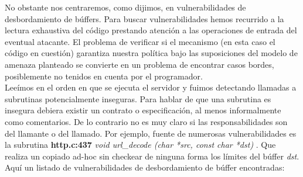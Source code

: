 \documentclass[12pt]{article}
\begin{document}
No obstante nos centraremos, como dijimos, en vulnerabilidades de desbordamiento de búffers. Para buscar vulnerabilidades hemos recurrido a la lectura exhaustiva del código prestando atención a las operaciones de entrada del eventual atacante. El problema de verificar si el mecanismo (en esta caso el código en cuestión) garantiza nuestra política bajo las suposiciones del modelo de amenaza planteado se convierte en un problema de encontrar casos bordes, posiblemente no tenidos en cuenta por el programador. \\

Leeímos en el orden en que se ejecuta el servidor y fuimos detectando llamadas a subrutinas potencialmente inseguras. Para hablar de que una subrutina es insegura debiera existir un contrato o especificación, al menos informalmente como comentarios. De lo contrario no es muy claro si las responsabilidades son del llamante o del llamado. Por ejemplo, fuente de numerosas vulnerabilidades es la subrutina \textbf{ \lbrack http.c:437\rbrack } \textit{ void url\_decode (char *src, const char *dst) }. Que realiza un copiado ad-hoc sin checkear de ninguna forma los límites del búffer \textit{dst}. \\

Aquí un listado de vulnerabilidades de desbordamiento de búffer encontradas:
\end{document}
